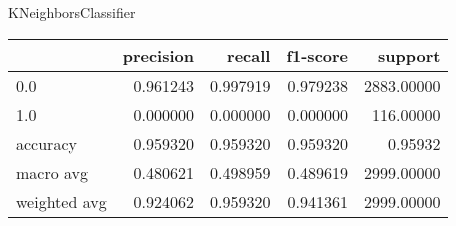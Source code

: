 KNeighborsClassifier
\begin{tabular}{lrrrr}
\toprule
{} &  precision &    recall &  f1-score &     support \\
\midrule
0.0          &   0.961243 &  0.997919 &  0.979238 &  2883.00000 \\
1.0          &   0.000000 &  0.000000 &  0.000000 &   116.00000 \\
accuracy     &   0.959320 &  0.959320 &  0.959320 &     0.95932 \\
macro avg    &   0.480621 &  0.498959 &  0.489619 &  2999.00000 \\
weighted avg &   0.924062 &  0.959320 &  0.941361 &  2999.00000 \\
\bottomrule
\end{tabular}
